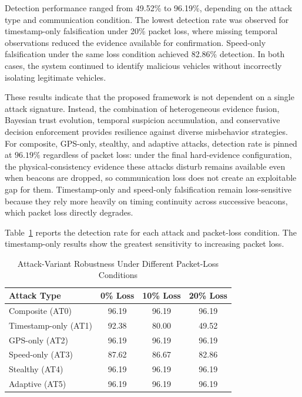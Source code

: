 \documentclass[journal]{IEEEtran}
\begin{document}
Detection performance ranged from 49.52\% to 96.19\%, depending on the attack
type and communication condition. The lowest detection rate was observed for
timestamp-only falsification under 20\% packet loss, where missing temporal
observations reduced the evidence available for confirmation. Speed-only
falsification under the same loss condition achieved 82.86\% detection. In
both cases, the system continued to identify malicious vehicles without
incorrectly isolating legitimate vehicles.

These results indicate that the proposed framework is not dependent on a
single attack signature. Instead, the combination of heterogeneous evidence
fusion, Bayesian trust evolution, temporal suspicion accumulation, and
conservative decision enforcement provides resilience against diverse
misbehavior strategies. For composite, GPS-only, stealthy, and adaptive
attacks, detection rate is pinned at $96.19\%$ regardless of packet loss:
under the final hard-evidence configuration, the physical-consistency
evidence these attacks disturb remains available even when beacons are
dropped, so communication loss does not create an exploitable gap for
them. Timestamp-only and speed-only falsification remain loss-sensitive
because they rely more heavily on timing continuity across successive
beacons, which packet loss directly degrades.

Table~\ref{tab:attack_variant} reports the detection rate for each attack and
packet-loss condition. The timestamp-only results show the greatest
sensitivity to increasing packet loss.

\begin{table}[!t]
\caption{Attack-Variant Robustness Under Different Packet-Loss Conditions}
\label{tab:attack_variant}
\centering
\renewcommand{\arraystretch}{1.15}
\footnotesize
\begin{tabular}{lccc}
\toprule
\textbf{Attack Type} & \textbf{0\% Loss} & \textbf{10\% Loss} & \textbf{20\% Loss} \\
\midrule
Composite (AT0)      & 96.19 & 96.19 & 96.19 \\
Timestamp-only (AT1) & 92.38 & 80.00 & 49.52 \\
GPS-only (AT2)       & 96.19 & 96.19 & 96.19 \\
Speed-only (AT3)     & 87.62 & 86.67 & 82.86 \\
Stealthy (AT4)       & 96.19 & 96.19 & 96.19 \\
Adaptive (AT5)       & 96.19 & 96.19 & 96.19 \\
\bottomrule
\end{tabular}
\end{table}
\end{document}
